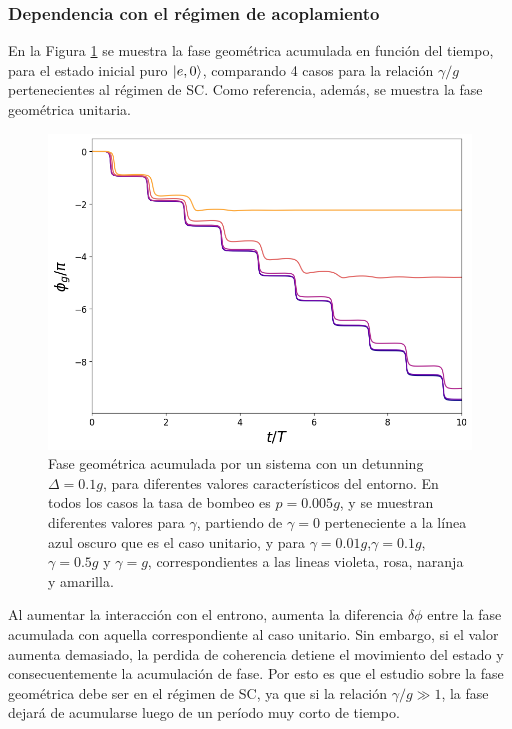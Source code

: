 \subsubsection{Dependencia con el régimen de acoplamiento}
En la Figura \ref{fig3:fg gamma} se muestra la fase geométrica acumulada en función del tiempo, para el estado inicial puro $\ket{e,0}$, comparando 4 casos para la relación $\gamma/g$ pertenecientes al régimen de SC. Como referencia, además, se muestra la fase geométrica unitaria.
\begin{figure}[H]
    \begin{minipage}[c]{0.67\textwidth}
        \includegraphics[width=\textwidth]{figuras/ch3/fg gamma.png}
      \end{minipage}\hfill
      \begin{minipage}[c]{0.3\textwidth}
        \caption{
            Fase geométrica acumulada por un sistema con un detunning $\Delta=0.1g$, para diferentes valores característicos del entorno. En todos los casos la tasa de bombeo es $p=0.005g$, y se muestran diferentes valores para $\gamma$, partiendo de $\gamma=0$ perteneciente a la línea azul oscuro que es el caso unitario, y para $\gamma=0.01g$,$\gamma=0.1g$,$\gamma=0.5g$ y $\gamma=g$, correspondientes a las lineas violeta, rosa, naranja y amarilla.
        } \label{fig3:fg gamma}
      \end{minipage}
\end{figure}
Al aumentar la interacción con el entrono, aumenta la diferencia $\delta \phi$ entre la fase acumulada con aquella correspondiente al caso unitario. Sin embargo, si el valor aumenta demasiado, la perdida de coherencia detiene el movimiento del estado y consecuentemente la acumulación de fase. Por esto es que el estudio sobre la fase geométrica debe ser en el régimen de SC, ya que si la relación $\gamma/g\gg 1$, la fase dejará de acumularse luego de un período muy corto de tiempo.


